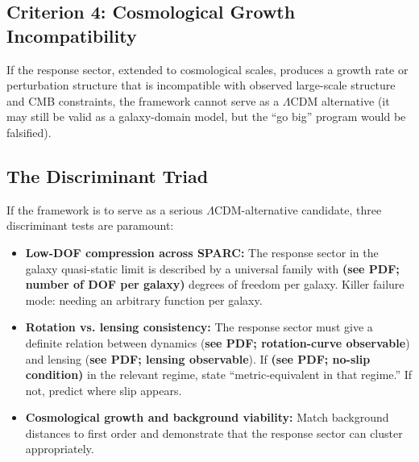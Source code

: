 \subsection{Criterion 4: Cosmological Growth Incompatibility}

If the response sector, extended to cosmological scales, produces a growth rate or perturbation structure that is incompatible with observed large-scale structure and CMB constraints, the framework cannot serve as a $\Lambda$CDM alternative (it may still be valid as a galaxy-domain model, but the ``go big'' program would be falsified).

\subsection{The Discriminant Triad}

If the framework is to serve as a serious $\Lambda$CDM-alternative candidate, three discriminant tests are paramount:
\begin{itemize}
	\item \textbf{Low-DOF compression across SPARC:} The response sector in the galaxy quasi-static limit is described by a universal family with \textbf{(see PDF; number of DOF per galaxy)} degrees of freedom per galaxy. Killer failure mode: needing an arbitrary function per galaxy.
	\item \textbf{Rotation vs.
	lensing consistency:} The response sector must give a definite relation between dynamics (\textbf{see PDF; rotation-curve observable}) and lensing (\textbf{see PDF; lensing observable}). If \textbf{(see PDF; no-slip condition)} in the relevant regime, state ``metric-equivalent in that regime.'' If not, predict where slip appears.
	\item \textbf{Cosmological growth and background viability:} Match background distances to first order and demonstrate that the response sector can cluster appropriately.
\end{itemize}
